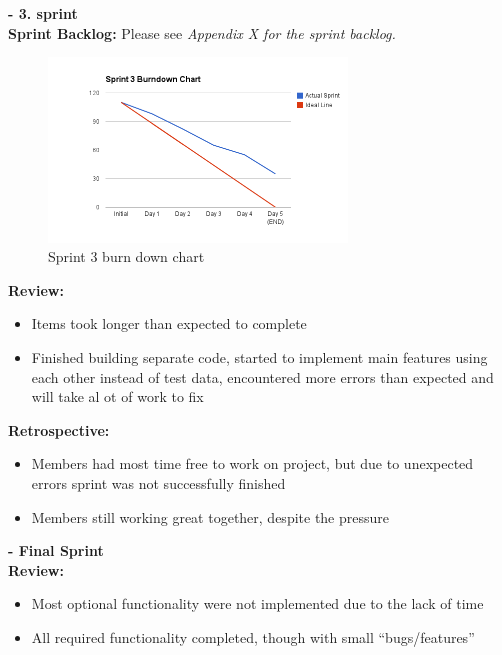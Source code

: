 \documentclass[11pt]{article}
\begin{document}
\textbf{- 3. sprint} \\

\textbf{Sprint Backlog:} Please see \emph{Appendix X for the sprint backlog.}
\begin{figure}[H]
  		\centering
    	\includegraphics[width=300px]{images/SCRUM/Sprint 3 burndown chart.png}
    	\caption{Sprint 3 burn down chart}
\end{figure}

     \textbf{Review:}
\begin{itemize}
\item Items took longer than expected to complete
\item Finished building separate code, started to implement main features using each other
       instead of test data, encountered more errors than expected and will take al ot of
       work to fix
\end{itemize}

     \textbf{Retrospective:}
\begin{itemize}
\item Members had most time free to work on project, but due to unexpected errors
       sprint was not successfully finished
\item Members still working great together, despite the pressure
\end{itemize}


\textbf{- Final Sprint} \\
\textbf{Review:}
\begin{itemize}
\item Most optional functionality were not implemented due to the lack of time
\item All required functionality completed, though with small ``bugs/features''
\end{itemize}
\end{document}
